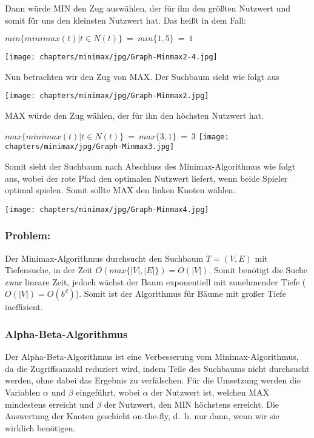 Dann würde MIN den Zug auswählen, der für ihn den größten Nutzwert und somit für uns den kleinsten Nutzwert hat. Das heißt in dem Fall:
\begin{center}
	$min\{minimax(t) | t \in N(t)\} ~=~ min\{1,5\} ~=~ 1$

	\texttt{[image: chapters/minimax/jpg/Graph-Minmax2-4.jpg]}
\end{center}

Nun betrachten wir den Zug von MAX. Der Suchbaum sieht wie folgt aus

\begin{center}
	\texttt{[image: chapters/minimax/jpg/Graph-Minmax2.jpg]}
\end{center}

MAX würde den Zug wählen, der für ihn den höchsten Nutzwert hat.\\

\begin{center}
	$max\{minimax(t) | t \in N(t)\} ~=~ max\{3,1\} ~=~ 3$
	\texttt{[image: chapters/minimax/jpg/Graph-Minmax3.jpg]}
\end{center}

Somit sieht der Suchbaum nach Abschluss des Minimax-Algorithmus wie folgt aus, wobei der rote Pfad den optimalen Nutzwert liefert, wenn beide Spieler optimal spielen. Somit sollte MAX den linken Knoten wählen.

\begin{center}
	\texttt{[image: chapters/minimax/jpg/Graph-Minmax4.jpg]}
\end{center}

\vskip 60pt



\subsubsection*{Problem:} Der Minimax-Algorithmus durchsucht den Suchbaum $T=(V, E)$ mit Tiefensuche, in der Zeit $O(max \{|V|, |E|\}) = O(|V|)$. Somit benötigt die Suche zwar lineare Zeit, jedoch wächst der Baum exponentiell mit zunehmender Tiefe ($O(|V|)=O(b^d)$). Somit ist der Algorithmus für Bäume mit großer Tiefe ineffizient.


\subsubsection*{Alpha-Beta-Algorithmus}
 Der Alpha-Beta-Algorithmus ist eine Verbesserung vom Minimax-Algorithmus, da die Zugriffsanzahl reduziert wird, indem Teile des Suchbaums nicht durchsucht werden, ohne dabei das Ergebnis zu verfälschen. Für die Umsetzung werden die Variablen $\alpha$ und $\beta$ eingeführt, wobei $\alpha$ der Nutzwert ist, welchen MAX mindestens erreicht und $\beta$ der Nutzwert, den MIN höchstens erreicht. Die Auswertung der Knoten geschieht on-the-fly, d.~h. nur dann, wenn wir sie wirklich benötigen. \\

